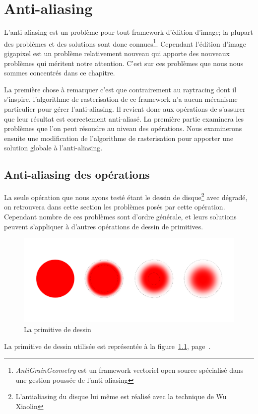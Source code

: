 \chapter{Anti-aliasing}
	L'anti-aliasing est un problème pour tout framework d'édition d'image; la plupart
	des problèmes et des solutions sont donc connues\footnote{\emph{AntiGrainGeometry} est un framework vectoriel open source spécialisé dans une gestion poussée de l'anti-aliasing}. 
	Cependant l'édition d'image gigapixel est un problème relativement nouveau qui
	apporte des nouveaux problèmes qui méritent notre attention. C'est sur ces problèmes
	que nous nous sommes concentrés dans ce chapitre. 

	La première chose à remarquer c'est que contrairement au raytracing dont il s'inspire,
	l'algorithme de rasterisation de ce framework n'a aucun mécanisme
	particulier pour gérer l'anti-aliasing. Il revient donc aux opérations de s'assurer que
	leur résultat est correctement anti-aliasé. La première partie examinera les 
	problèmes que l'on peut résoudre au niveau des opérations. Nous examinerons ensuite 
	une modification de l'algorithme de rasterisation pour apporter une solution globale à
	l'anti-aliasing.

	\section{Anti-aliasing des opérations}

	La seule opération que nous ayons testé étant le dessin de disque\footnote{L'antialiasing du disque lui même est réalisé avec la technique de Wu Xiaolin\cite{wucircle}} avec 
	dégradé, on retrouvera dans cette section les problèmes posés par cette opération.
	Cependant nombre de ces problèmes sont d'ordre générale, et leurs solutions peuvent
	s'appliquer à d'autres opérations de dessin de primitives. 

		\begin{figure}[ht]
			\centering
			\includegraphics[width=\textwidth]{images/brushes} 
			\caption{La primitive de dessin}
			\label{fig:brush}
		\end{figure}
	La primitive de dessin utilisée est représentée à la figure~\ref{fig:brush}, page~\pageref{fig:brush}.
	
